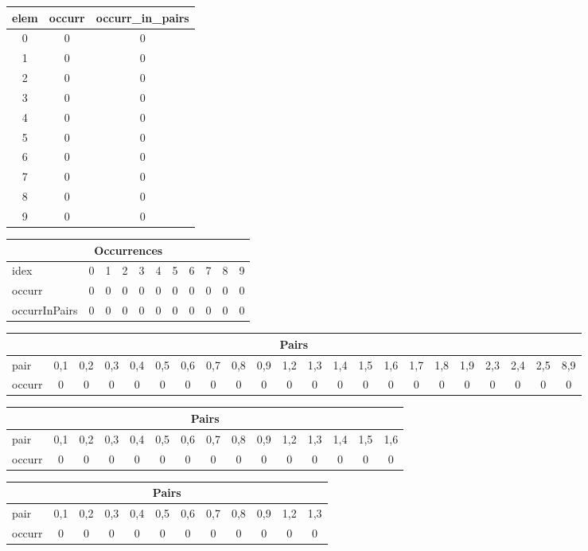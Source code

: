 \begin{tabular} {|c |c |c |}  
 \hline 
  elem & occurr & occurr_in_pairs \\ \hline \hline 
0 & 0 & 0 \\ \hline 
1 & 0 & 0 \\ \hline 
2 & 0 & 0 \\ \hline 
3 & 0 & 0 \\ \hline 
4 & 0 & 0 \\ \hline 
5 & 0 & 0 \\ \hline 
6 & 0 & 0 \\ \hline 
7 & 0 & 0 \\ \hline 
8 & 0 & 0 \\ \hline 
9 & 0 & 0 \\ \hline 
\end{tabular}  



\begin{tabular} {| l ||c |c |c |c |c |c |c |c |c |c |}  
\multicolumn{ 11 }{c}{ Occurrences } \\ \hline 
idex & 0 & 1 & 2 & 3 & 4 & 5 & 6 & 7 & 8 & 9 \\ \hline 
occurr & 0 & 0 & 0 & 0 & 0 & 0 & 0 & 0 & 0 & 0 \\ \hline 
occurrInPairs & 0 & 0 & 0 & 0 & 0 & 0 & 0 & 0 & 0 & 0 \\ \hline 
\end{tabular}  


\begin{tabular} {| l ||c |c |c |c |c |c |c |c |c |c |c |c |c |c |c |c |c |c |c |c |c |}  
\multicolumn{ 22 }{c}{ Pairs } \\ \hline 
pair & 0,1 & 0,2 & 0,3 & 0,4 & 0,5 & 0,6 & 0,7 & 0,8 & 0,9 & 1,2 & 1,3 & 1,4 & 1,5 & 1,6 & 1,7 & 1,8 & 1,9 & 2,3 & 2,4 & 2,5 & 8,9 \\ \hline 
occurr & 0 & 0 & 0 & 0 & 0 & 0 & 0 & 0 & 0 & 0 & 0 & 0 & 0 & 0 & 0 & 0 & 0 & 0 & 0 & 0 & 0 \\ \hline 
\end{tabular}  
\begin{tabular} {| l ||c |c |c |c |c |c |c |c |c |c |c |c |c |c |}  
\multicolumn{ 15 }{c}{ Pairs } \\ \hline 
pair & 0,1 & 0,2 & 0,3 & 0,4 & 0,5 & 0,6 & 0,7 & 0,8 & 0,9 & 1,2 & 1,3 & 1,4 & 1,5 & 1,6 \\ \hline 
occurr & 0 & 0 & 0 & 0 & 0 & 0 & 0 & 0 & 0 & 0 & 0 & 0 & 0 & 0 \\ \hline 
\end{tabular}  
\begin{tabular} {| l ||c |c |c |c |c |c |c |c |c |c |c |}  
\multicolumn{ 12 }{c}{ Pairs } \\ \hline 
pair & 0,1 & 0,2 & 0,3 & 0,4 & 0,5 & 0,6 & 0,7 & 0,8 & 0,9 & 1,2 & 1,3 \\ \hline 
occurr & 0 & 0 & 0 & 0 & 0 & 0 & 0 & 0 & 0 & 0 & 0 \\ \hline 
\end{tabular}  


